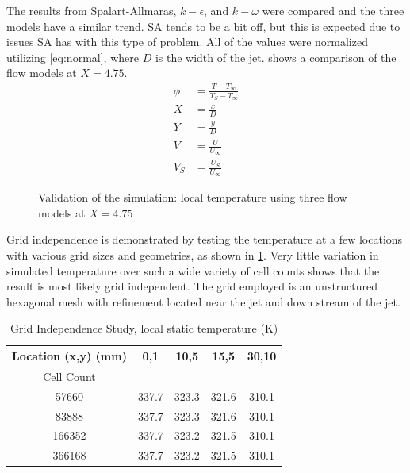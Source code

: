 \documentclass[preprint,12pt]{elsarticle}
\begin{document}
The results from Spalart-Allmaras, $k-\epsilon$, and $k-\omega$ were compared and the three models have a similar trend.  SA tends to be a bit off, but this is expected due to issues SA has with this type of problem\cite{fluent}.  All of the values were normalized utilizing \cref{eq:normal}, where $D$ is the width of the jet.   shows a comparison of the flow models at $X=4.75$.
\begin{subequations}
\begin{align}
\phi &= \frac{T-T_{\infty}}{T_S-T_{\infty}} \\
X &= \frac{x}{D} \\
Y &= \frac{y}{D} \\
V &= \frac{U}{U_\infty}  \\
V_S &= \frac{U_S}{U_{\infty}}
\end{align}
\label{eq:normal}
\end{subequations}
\begin{figure}[!tbp]
	\centering
  \setlength\figureheight{5cm} 
	\setlength\figurewidth{5cm}
	
	\caption{Validation of the simulation: local temperature using three flow models at $X=4.75$}
	\label{fig:jetmodel15mm}
\end{figure}

Grid independence is demonstrated by testing the temperature at a few locations with various grid sizes and geometries, as shown in \cref{tab:gridjet}.  Very little variation in simulated temperature over such a wide variety of cell counts shows that the result is most likely grid independent.  The grid employed is an unstructured hexagonal mesh with refinement located near the jet and down stream of the jet.
\begin{table}[!t!b!p]
\begin{center}
\begin{tabular}{ c c c c c }
\hline
 Location (x,y) (mm) & 0,1 & 10,5 & 15,5& 30,10 \\ \hline \hline
 Cell Count & \\ \hline
 57660  & 337.7 & 323.3 & 321.6 & 310.1 \\ \hline
 83888  & 337.7 & 323.3 & 321.6 & 310.1 \\ \hline
 166352 & 337.7 & 323.2 & 321.5 & 310.1 \\ \hline
 366168 & 337.7 & 323.2 & 321.5 & 310.1 \\ \hline
\end{tabular}
\caption{Grid Independence Study, local static temperature (K)}
\label{tab:gridjet}
\end{center}
\end{table}
\end{document}
